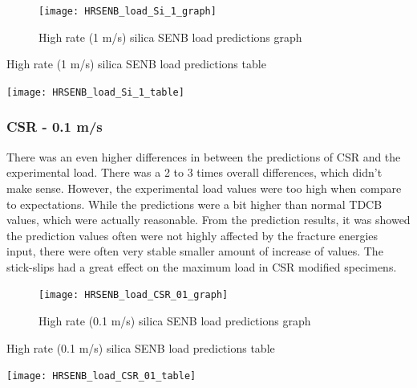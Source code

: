 \documentclass[numbers=noendperiod,chapterprefix=on]{icldt} %
\begin{document}
{\begin{figure}[!hp]
   \centering
   \texttt{[image: HRSENB\_load\_Si\_1\_graph]}\label{HRSENB_load_Si_1_graph}
   \caption{High rate (1 m/s) silica SENB load predictions graph}
   \end{figure}
  \FloatBarrier
  
  \begin{table}
     \centering
     \caption{High rate (1 m/s) silica SENB load predictions table}\label{HRSENB_load_Si_1_table}
     \texttt{[image: HRSENB\_load\_Si\_1\_table]}
     \end{table}
     \FloatBarrier      

\subsubsection{CSR - 0.1 m/s}
There was an even higher differences in between the predictions of CSR and the experimental load. There was a 2 to 3 times overall differences, which didn't make sense. However, the experimental load values were too high when compare to expectations. While the predictions were a bit higher than normal TDCB values, which were actually reasonable. From the prediction results, it was showed the prediction values often were not highly affected by the fracture energies input, there were often very stable smaller amount of increase of values. The stick-slips had a great effect on the maximum load in CSR modified specimens.

\begin{figure}[!hp]
   \centering
   \texttt{[image: HRSENB\_load\_CSR\_01\_graph]}\label{HRSENB_load_CSR_01_graph}
   \caption{High rate (0.1 m/s) silica SENB load predictions graph}
   \end{figure}
  \FloatBarrier
  
  \begin{table}
     \centering
     \caption{High rate (0.1 m/s) silica SENB load predictions table}\label{HRSENB_load_CSR_01_table}
     \texttt{[image: HRSENB\_load\_CSR\_01\_table]}
     \end{table}
     \FloatBarrier      

}
\end{document}
